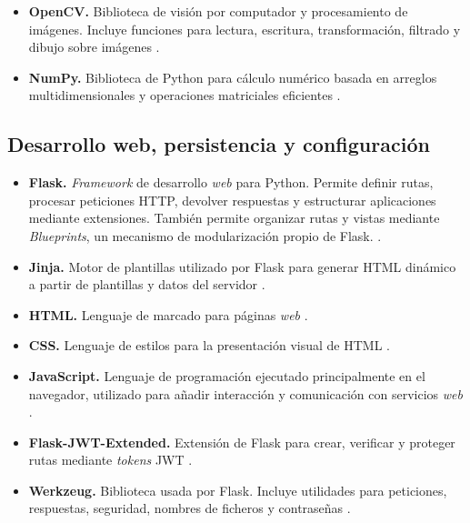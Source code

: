 \begin{itemize}
	\item \textbf{OpenCV.} Biblioteca de visión por computador y procesamiento de imágenes. Incluye funciones para lectura, escritura, transformación, filtrado y dibujo sobre imágenes \cite{opencv_docs}.
	
	\item \textbf{NumPy.} Biblioteca de Python para cálculo numérico basada en arreglos multidimensionales y operaciones matriciales eficientes \cite{numpy_docs}.
\end{itemize}

\subsection{Desarrollo web, persistencia y configuración}

\begin{itemize}
	\item \textbf{Flask.} \textit{Framework} de desarrollo \textit{web} para Python. Permite definir rutas, procesar peticiones HTTP, devolver respuestas y estructurar aplicaciones mediante extensiones.
	También permite organizar rutas y vistas mediante \textit{Blueprints}, un mecanismo de modularización propio de Flask. \cite{flask_docs}.
	
	\item \textbf{Jinja.} Motor de plantillas utilizado por Flask para generar HTML dinámico a partir de plantillas y datos del servidor \cite{flask_docs}.
	
	\item \textbf{HTML.} Lenguaje de marcado para páginas \textit{web} \cite{mdn_html}.
	
	\item \textbf{CSS.} Lenguaje de estilos para la presentación visual de HTML \cite{mdn_css}.
	
	\item \textbf{JavaScript.} Lenguaje de programación ejecutado principalmente en el navegador, utilizado para añadir interacción y comunicación con servicios \textit{web} \cite{mdn_javascript}.
	
	\item \textbf{Flask-JWT-Extended.} Extensión de Flask para crear, verificar y proteger rutas mediante \textit{tokens} JWT \cite{jwt_docs}.
	
	\item \textbf{Werkzeug.} Biblioteca usada por Flask. Incluye utilidades para peticiones, respuestas, seguridad, nombres de ficheros y contraseñas \cite{werkzeug_docs}.
	

\end{itemize}
